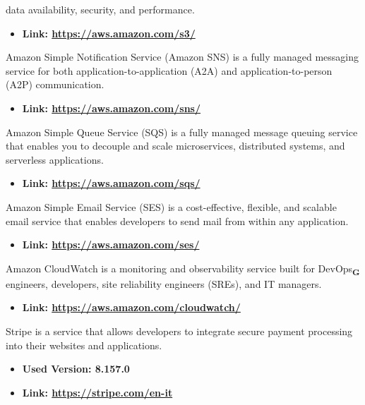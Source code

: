 data availability, security, and performance.
\begin{itemize}
    \item \textbf{Link: \url{https://aws.amazon.com/s3/}}
\end{itemize}
Amazon Simple Notification Service (Amazon SNS) is a fully managed messaging service for both application-to-application (A2A) and application-to-person (A2P) communication.
\begin{itemize}
    \item \textbf{Link: \url{https://aws.amazon.com/sns/}}
\end{itemize}
Amazon Simple Queue Service (SQS) is a fully managed message queuing service that enables you to decouple and scale microservices, distributed systems, and serverless applications.
\begin{itemize}
    \item \textbf{Link: \url{https://aws.amazon.com/sqs/}}
\end{itemize}
Amazon Simple Email Service (SES) is a cost-effective, flexible, and scalable email service that enables developers to send mail from within any application.
\begin{itemize}
    \item \textbf{Link: \url{https://aws.amazon.com/ses/}}
\end{itemize}
Amazon CloudWatch is a monitoring and observability service built for DevOps\textsubscript{\textbf{G}} engineers, developers, site reliability engineers (SREs), and IT managers.
\begin{itemize}
    \item \textbf{Link: \url{https://aws.amazon.com/cloudwatch/}}
\end{itemize}
Stripe is a service that allows developers to integrate secure payment processing into their websites and applications.
\begin{itemize}
    \item \textbf{Used Version: 8.157.0}
    \item \textbf{Link: \url{https://stripe.com/en-it}}
\end{itemize}
